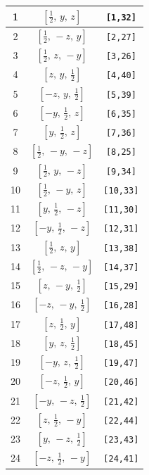 \documentclass[fleqn,8pt]{jsarticle}
\begin{document}
\begin{longtable}{ccc}
1 & $\left[ \frac{1}{2},\, y,\, z \right]$ & {\tt [1,32]} \\ \hline
2 & $\left[ \frac{1}{2},\, - z,\, y \right]$ & {\tt [2,27]} \\ \hline
3 & $\left[ \frac{1}{2},\, z,\, - y \right]$ & {\tt [3,26]} \\ \hline
4 & $\left[ z,\, y,\, \frac{1}{2} \right]$ & {\tt [4,40]} \\ \hline
5 & $\left[ - z,\, y,\, \frac{1}{2} \right]$ & {\tt [5,39]} \\ \hline
6 & $\left[ - y,\, \frac{1}{2},\, z \right]$ & {\tt [6,35]} \\ \hline
7 & $\left[ y,\, \frac{1}{2},\, z \right]$ & {\tt [7,36]} \\ \hline
8 & $\left[ \frac{1}{2},\, - y,\, - z \right]$ & {\tt [8,25]} \\ \hline
9 & $\left[ \frac{1}{2},\, y,\, - z \right]$ & {\tt [9,34]} \\ \hline
10 & $\left[ \frac{1}{2},\, - y,\, z \right]$ & {\tt [10,33]} \\ \hline
11 & $\left[ y,\, \frac{1}{2},\, - z \right]$ & {\tt [11,30]} \\ \hline
12 & $\left[ - y,\, \frac{1}{2},\, - z \right]$ & {\tt [12,31]} \\ \hline
13 & $\left[ \frac{1}{2},\, z,\, y \right]$ & {\tt [13,38]} \\ \hline
14 & $\left[ \frac{1}{2},\, - z,\, - y \right]$ & {\tt [14,37]} \\ \hline
15 & $\left[ z,\, - y,\, \frac{1}{2} \right]$ & {\tt [15,29]} \\ \hline
16 & $\left[ - z,\, - y,\, \frac{1}{2} \right]$ & {\tt [16,28]} \\ \hline
17 & $\left[ z,\, \frac{1}{2},\, y \right]$ & {\tt [17,48]} \\ \hline
18 & $\left[ y,\, z,\, \frac{1}{2} \right]$ & {\tt [18,45]} \\ \hline
19 & $\left[ - y,\, z,\, \frac{1}{2} \right]$ & {\tt [19,47]} \\ \hline
20 & $\left[ - z,\, \frac{1}{2},\, y \right]$ & {\tt [20,46]} \\ \hline
21 & $\left[ - y,\, - z,\, \frac{1}{2} \right]$ & {\tt [21,42]} \\ \hline
22 & $\left[ z,\, \frac{1}{2},\, - y \right]$ & {\tt [22,44]} \\ \hline
23 & $\left[ y,\, - z,\, \frac{1}{2} \right]$ & {\tt [23,43]} \\ \hline
24 & $\left[ - z,\, \frac{1}{2},\, - y \right]$ & {\tt [24,41]} \\
\end{longtable}
\end{document}
